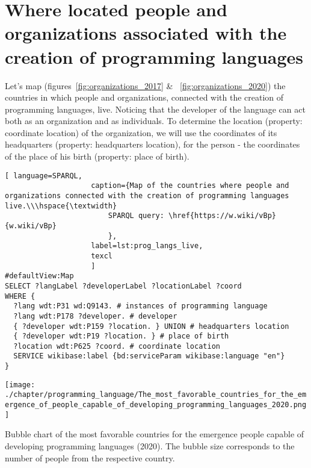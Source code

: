 \section{Where located people and organizations associated with the creation of programming languages}

Let's map (figures~\ref{fig:organizations_2017} \& ~\ref{fig:organizations_2020}) the countries in which people and organizations, connected with the creation of programming languages, live. Noticing that the developer of the language can act both as an organization and as individuals. To determine the location (property: coordinate location) of the organization, we will use the coordinates of its headquarters (property: headquarters location), for the person - the coordinates of the place of his birth (property: place of birth).

\begin{lstlisting}[ language=SPARQL, 
                    caption={Map of the countries where people and organizations connected with the creation of programming languages live.\\\hspace{\textwidth}
                        SPARQL query: \href{https://w.wiki/vBp}{w.wiki/vBp}
                        },
                    label=lst:prog_langs_live,
                    texcl 
                    ]
#defaultView:Map
SELECT ?langLabel ?developerLabel ?locationLabel ?coord
WHERE {
  ?lang wdt:P31 wd:Q9143. # instances of programming language
  ?lang wdt:P178 ?developer. # developer
  { ?developer wdt:P159 ?location. } UNION # headquarters location
  { ?developer wdt:P19 ?location. } # place of birth
  ?location wdt:P625 ?coord. # coordinate location
  SERVICE wikibase:label {bd:serviceParam wikibase:language "en"} 	
}
\end{lstlisting}%
\begin{marginfigure}[-3cm]
	\texttt{[image: ./chapter/programming\_language/The\_most\_favorable\_countries\_for\_the\_emergence\_of\_people\_capable\_of\_developing\_programming\_languages\_2020.png]}
	\caption[Bubble chart of the most favorable countries for the emergence people capable of developing programming languages (2020).]{Bubble chart of the most favorable countries for the emergence people capable of developing programming languages (2020). The bubble size corresponds to the number of people from the respective country.}
	\label{fig:emergence_2020}
\end{marginfigure}

